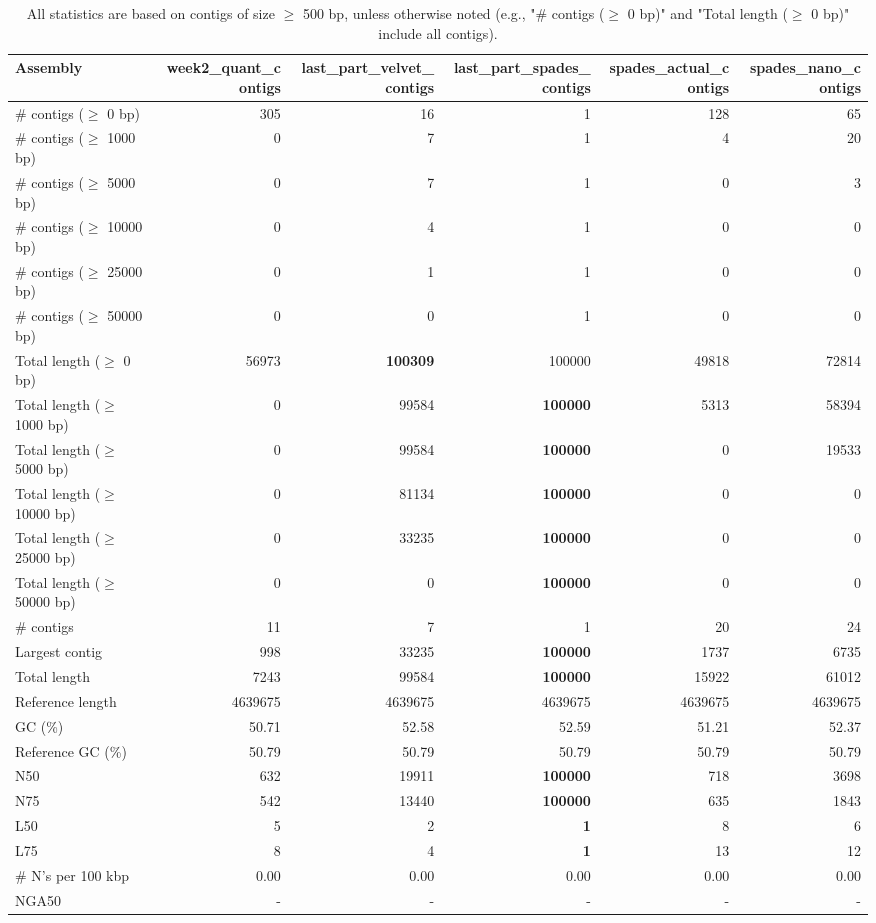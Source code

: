 \documentclass[12pt,a4paper]{article}
\begin{document}
\begin{table}[ht]
\begin{center}
\caption{All statistics are based on contigs of size $\geq$ 500 bp, unless otherwise noted (e.g., "\# contigs ($\geq$ 0 bp)" and "Total length ($\geq$ 0 bp)" include all contigs).}
\begin{tabular}{|l*{5}{|r}|}
\hline
Assembly & week2\_quant\_contigs & last\_part\_velvet\_contigs & last\_part\_spades\_contigs & spades\_actual\_contigs & spades\_nano\_contigs \\ \hline
\# contigs ($\geq$ 0 bp) & 305 & 16 & 1 & 128 & 65 \\ \hline
\# contigs ($\geq$ 1000 bp) & 0 & 7 & 1 & 4 & 20 \\ \hline
\# contigs ($\geq$ 5000 bp) & 0 & 7 & 1 & 0 & 3 \\ \hline
\# contigs ($\geq$ 10000 bp) & 0 & 4 & 1 & 0 & 0 \\ \hline
\# contigs ($\geq$ 25000 bp) & 0 & 1 & 1 & 0 & 0 \\ \hline
\# contigs ($\geq$ 50000 bp) & 0 & 0 & 1 & 0 & 0 \\ \hline
Total length ($\geq$ 0 bp) & 56973 & {\bf 100309} & 100000 & 49818 & 72814 \\ \hline
Total length ($\geq$ 1000 bp) & 0 & 99584 & {\bf 100000} & 5313 & 58394 \\ \hline
Total length ($\geq$ 5000 bp) & 0 & 99584 & {\bf 100000} & 0 & 19533 \\ \hline
Total length ($\geq$ 10000 bp) & 0 & 81134 & {\bf 100000} & 0 & 0 \\ \hline
Total length ($\geq$ 25000 bp) & 0 & 33235 & {\bf 100000} & 0 & 0 \\ \hline
Total length ($\geq$ 50000 bp) & 0 & 0 & {\bf 100000} & 0 & 0 \\ \hline
\# contigs & 11 & 7 & 1 & 20 & 24 \\ \hline
Largest contig & 998 & 33235 & {\bf 100000} & 1737 & 6735 \\ \hline
Total length & 7243 & 99584 & {\bf 100000} & 15922 & 61012 \\ \hline
Reference length & 4639675 & 4639675 & 4639675 & 4639675 & 4639675 \\ \hline
GC (\%) & 50.71 & 52.58 & 52.59 & 51.21 & 52.37 \\ \hline
Reference GC (\%) & 50.79 & 50.79 & 50.79 & 50.79 & 50.79 \\ \hline
N50 & 632 & 19911 & {\bf 100000} & 718 & 3698 \\ \hline
N75 & 542 & 13440 & {\bf 100000} & 635 & 1843 \\ \hline
L50 & 5 & 2 & {\bf 1} & 8 & 6 \\ \hline
L75 & 8 & 4 & {\bf 1} & 13 & 12 \\ \hline
\# N's per 100 kbp & 0.00 & 0.00 & 0.00 & 0.00 & 0.00 \\ \hline
NGA50 & - & - & - & - & - \\ \hline
\end{tabular}
\end{center}
\end{table}
\end{document}
